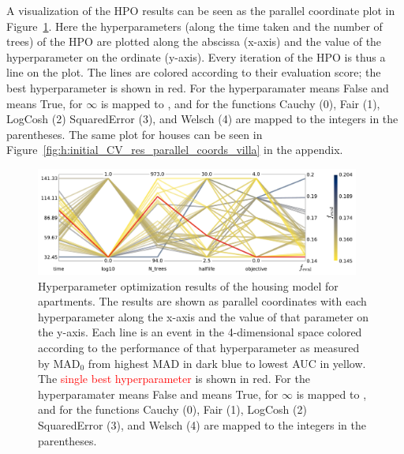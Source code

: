 A visualization of the HPO results can be seen as the parallel coordinate plot in Figure~\ref{fig:h:initial_CV_res_parallel_coords_ejer}. Here the hyperparameters (along the time taken and the number of trees) of the HPO are plotted along the abscissa (x-axis) and the value of the hyperparameter on the ordinate (y-axis). Every iteration of the HPO is thus a line on the plot. The lines are colored according to their evaluation score; the best hyperparameter is shown in red. For the hyperparamater   means False and  means True, for  $\infty$ is mapped to , and for  the functions Cauchy (0), Fair (1), LogCosh (2) SquaredError (3), and Welsch (4) are mapped to the integers in the parentheses. The same plot for houses can be seen in Figure~\ref{fig:h:initial_CV_res_parallel_coords_villa} in the appendix.

\begin{figure}
  \includegraphics[width=0.95\textwidth, trim=0 0 0 0, clip]{figures/housing/Ejerlejlighed_v19_cut_all_Ncols_all_CV_viz_initial_HPO.pdf}
  \caption[Overview of initial hyperparamater optimization of the housing model for apartments]
          {Hyperparameter optimization results of the housing model for apartments. The results are shown as parallel coordinates with each hyperparameter along the x-axis and the value of that parameter on the y-axis. Each line is an event in the 4-dimensional space colored according to the performance of that hyperparameter as measured by $\mathrm{MAD}_0$ from \textcolor{viridis-dark}{highest} MAD in dark blue to \textcolor{viridis-light}{lowest} AUC in yellow. The \textcolor{red}{single best hyperparameter} is shown in red. For the hyperparamater   means False and  means True, for  $\infty$ is mapped to , and for  the functions Cauchy (0), Fair (1), LogCosh (2) SquaredError (3), and Welsch (4) are mapped to the integers in the parentheses.
          } 
  \label{fig:h:initial_CV_res_parallel_coords_ejer}
\end{figure}

